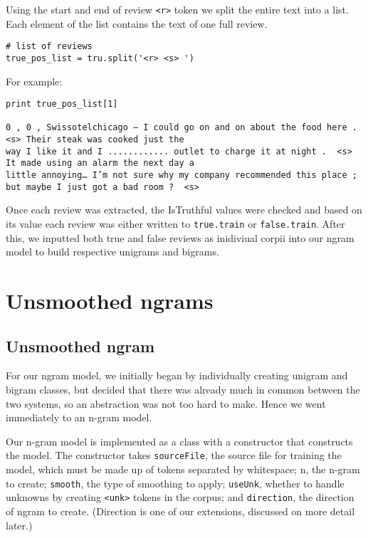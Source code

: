 \documentclass{article}
\begin{document}
Using the start and end of review \texttt{<r>} token we split the entire text into a list. Each element of the list contains the text of one full review. 

{\small\begin{verbatim}
# list of reviews
true_pos_list = tru.split('<r> <s> ')\end{verbatim}}

For example:
{\small\begin{verbatim}
print true_pos_list[1]

0 , 0 , Swissotelchicago – I could go on and on about the food here .  <s> Their steak was cooked just the 
way I like it and I ............ outlet to charge it at night .  <s> It made using an alarm the next day a
little annoying… I’m not sure why my company recommended this place ;  but maybe I just got a bad room ?  <s>
\end{verbatim}
}
Once each review was extracted, the IsTruthful values were checked and based on its value each review was either written to \texttt{true.train} or \texttt{false.train}. After this, we inputted both true and false reviews as inidiviual corpii into our ngram model to build respective unigrams and bigrams. 

\section{Unsmoothed ngrams}

\subsection{Unsmoothed ngram}

For our ngram model, we initially began by individually creating unigram and bigram classes, but decided that there was already much in common between the two systems, so an abstraction was not too hard to make. Hence we went immediately to an n-gram model. 

Our n-gram model is implemented as a class with a constructor that constructs the model. The constructor takes \texttt{sourceFile}, the source file for training the model, which must be made up of tokens separated by whitespace; n, the n-gram to create; \texttt{smooth}, the type of smoothing to apply; \texttt{useUnk}, whether to handle unknowns by creating \texttt{<unk>} tokens in the corpus; and \texttt{direction}, the direction of ngram to create. (Direction is one of our extensions, discussed on more detail later.)
\end{document}
